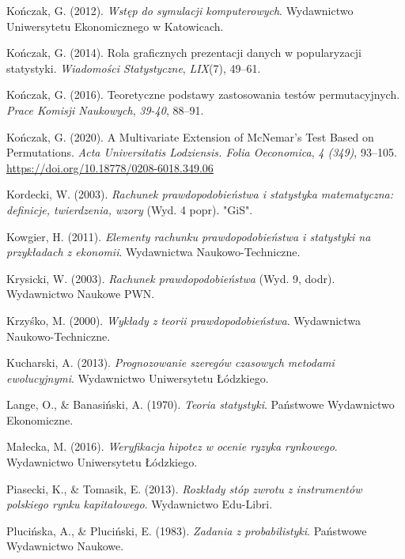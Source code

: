 \documentclass[
  letterpaper,
  DIV=11,
  numbers=noendperiod]{scrreprt}
\newlength{\cslhangindent}
\newenvironment{CSLReferences}[2] %
 {\begin{list}{}{%
  \setlength{\itemindent}{0pt}
  \setlength{\leftmargin}{0pt}
  \setlength{\parsep}{0pt}
  \ifodd #1
   \setlength{\leftmargin}{\cslhangindent}
   \setlength{\itemindent}{-1\cslhangindent}
  \fi
  \setlength{\itemsep}{#2\baselineskip}}}
 {\end{list}}
\begin{document}
\begin{CSLReferences}{1}{0}
Kończak, G. (2012). \emph{Wstęp do symulacji komputerowych}. Wydawnictwo
Uniwersytetu Ekonomicznego w Katowicach.

Kończak, G. (2014). Rola graficznych prezentacji danych w popularyzacji
statystyki. \emph{Wiadomo{ś}ci Statystyczne}, \emph{LIX}(7), 49--61.

Kończak, G. (2016). Teoretyczne podstawy zastosowania testów
permutacyjnych. \emph{Prace Komisji Naukowych}, \emph{39-40}, 88--91.

Kończak, G. (2020). A Multivariate Extension of McNemar{'}s Test Based
on Permutations. \emph{Acta Universitatis Lodziensis. Folia Oeconomica},
\emph{4 (349)}, 93--105. \url{https://doi.org/10.18778/0208-6018.349.06}

Kordecki, W. (2003). \emph{Rachunek prawdopodobie{ń}stwa i statystyka
matematyczna: definicje, twierdzenia, wzory} (Wyd. 4 popr). {"}GiS{"}.

Kowgier, H. (2011). \emph{Elementy rachunku prawdopodobie{ń}stwa i
statystyki na przyk{ł}adach z ekonomii}. Wydawnictwa Naukowo-Techniczne.

Krysicki, W. (2003). \emph{Rachunek prawdopodobie{ń}stwa} (Wyd. 9,
dodr). Wydawnictwo Naukowe PWN.

Krzyśko, M. (2000). \emph{Wyk{ł}ady z teorii prawdopodobie{ń}stwa}.
Wydawnictwa Naukowo-Techniczne.

Kucharski, A. (2013). \emph{Prognozowanie szeregów czasowych metodami
ewolucyjnymi}. Wydawnictwo Uniwersytetu {Ł}ódzkiego.

Lange, O., \& Banasiński, A. (1970). \emph{Teoria statystyki}.
Pa{ń}stwowe Wydawnictwo Ekonomiczne.

Małecka, M. (2016). \emph{Weryfikacja hipotez w ocenie ryzyka
rynkowego}. Wydawnictwo Uniwersytetu {Ł}ódzkiego.

Piasecki, K., \& Tomasik, E. (2013). \emph{Rozk{ł}ady stóp zwrotu z
instrumentów polskiego rynku kapita{ł}owego}. Wydawnictwo Edu-Libri.

Plucińska, A., \& Pluciński, E. (1983). \emph{Zadania z probabilistyki}.
Pa{ń}stwowe Wydawnictwo Naukowe.


\end{CSLReferences}
\end{document}
